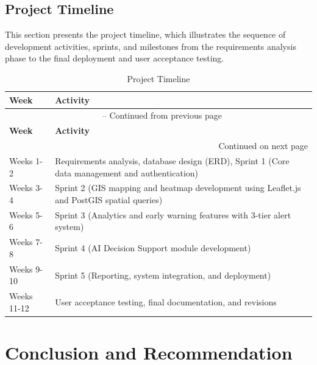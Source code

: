 \documentclass[12pt, a4paper]{report}
\begin{document}
\section{Project Timeline}
\label{sec:project_timeline}
This section presents the project timeline, which illustrates the sequence of development activities, sprints, and milestones from the requirements analysis phase to the final deployment and user acceptance testing.

\vspace{0.3cm}
\begin{longtable}{p{3cm} p{11cm}}
    \caption{Project Timeline} \label{tab:project_timeline} \\
    \toprule
    \textbf{Week} & \textbf{Activity} \\
    \midrule
    \endfirsthead
    \multicolumn{2}{c}{{\tablename\ \thetable{} -- Continued from previous page}} \\
    \toprule
    \textbf{Week} & \textbf{Activity} \\
    \midrule
    \endhead
    \midrule
    \multicolumn{2}{r}{{Continued on next page}} \\
    \endfoot
    \bottomrule
    \endlastfoot
    Weeks 1-2 & Requirements analysis, database design (ERD), Sprint 1 (Core data management and authentication) \\
    \addlinespace
    Weeks 3-4 & Sprint 2 (GIS mapping and heatmap development using Leaflet.js and PostGIS spatial queries) \\
    \addlinespace
    Weeks 5-6 & Sprint 3 (Analytics and early warning features with 3-tier alert system) \\
    \addlinespace
    Weeks 7-8 & Sprint 4 (AI Decision Support module development) \\
    \addlinespace
    Weeks 9-10 & Sprint 5 (Reporting, system integration, and deployment) \\
    \addlinespace
    Weeks 11-12 & User acceptance testing, final documentation, and revisions \\
\end{longtable}
\vspace{0.3cm}

\chapter{Conclusion and Recommendation}
\label{chap:conclusion}
\end{document}
